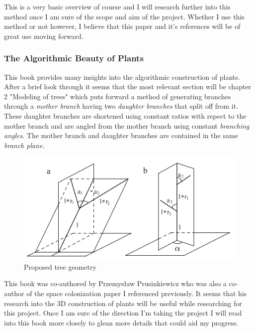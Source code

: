 \documentclass[proposal]{cmpreport}
\begin{document}
This is a very basic overview of course and I will research further into this method 
once I am sure of the scope and aim of the project. Whether I use this method or not 
however, I believe that this paper and it's references will be of great use moving 
forward.

\subsubsection{The Algorithmic Beauty of Plants}
This book \cite{beautyOfPlants} provides many insights into the algorithmic construction 
of plants. After a brief look through it seems that the most relevant section will be 
chapter 2 "Modeling of trees" which puts forward a method of generating branches through 
a \textit{mother branch} having two \textit{daughter branches} that split off from it. 
These daughter branches are shortened using constant ratios with repect to the mother 
branch and are angled from the mother branch using constant \textit{branching angles}. 
The mother branch and daughter branches are contained in the same \textit{branch plane}.

\begin{figure}[h]
        \caption{Proposed tree geometry}
        \includegraphics{MDbranches}
        \centering
\end{figure}

This book was co-authored by Przemysław Prusinkiewicz who was also a co-author of the 
space colonization paper I referenced previously. It seems that his research into 
the 3D construction of plants will be useful while researching for this project. 
Once I am sure of the direction I'm taking the project I will read into this book more 
closely to glean more details that could aid my progress.
\end{document}
